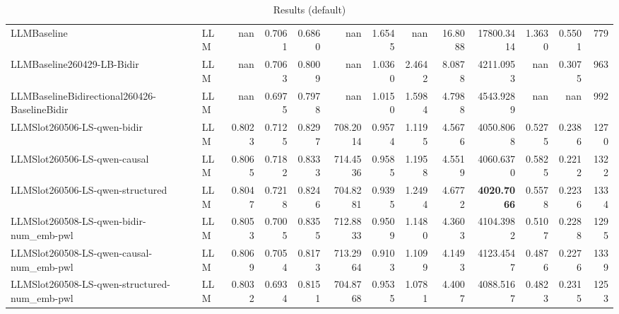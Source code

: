 \begin{table}[htbp]
{\begin{tabular}{ll|rrrrrrrrrr|r}
LLMBaseline & LLM & nan & 0.7061 & 0.6860 & nan & 1.6545 & nan & 16.8088 & 17800.3414 & 1.3630 & 0.5501 & 779 \\
LLMBaseline260429-LB-Bidir & LLM & nan & 0.7063 & 0.8009 & nan & 1.0360 & 2.4642 & 8.0878 & 4211.0953 & nan & 0.3075 & 963 \\
LLMBaselineBidirectional260426-BaselineBidir & LLM & nan & 0.6975 & 0.7978 & nan & 1.0150 & 1.5984 & 4.7988 & 4543.9289 & nan & nan & 992 \\
LLMSlot260506-LS-qwen-bidir & LLM & 0.8023 & 0.7125 & 0.8297 & 708.2014 & 0.9574 & 1.1195 & 4.5676 & 4050.8068 & 0.5275 & 0.2386 & 1270 \\
LLMSlot260506-LS-qwen-causal & LLM & 0.8065 & 0.7182 & 0.8333 & 714.4536 & 0.9585 & 1.1958 & 4.5519 & 4060.6370 & 0.5825 & 0.2212 & 1322 \\
LLMSlot260506-LS-qwen-structured & LLM & 0.8047 & 0.7218 & 0.8246 & 704.8281 & 0.9395 & 1.2494 & 4.6772 & \textbf{4020.7066} & 0.5578 & 0.2236 & 1334 \\
LLMSlot260508-LS-qwen-bidir-num\_emb-pwl & LLM & 0.8053 & 0.7005 & 0.8355 & 712.8833 & 0.9509 & 1.1480 & 4.3603 & 4104.3982 & 0.5107 & 0.2288 & 1295 \\
LLMSlot260508-LS-qwen-causal-num\_emb-pwl & LLM & 0.8069 & 0.7054 & 0.8173 & 713.2964 & 0.9103 & 1.1099 & 4.1493 & 4123.4547 & 0.4876 & 0.2276 & 1339 \\
LLMSlot260508-LS-qwen-structured-num\_emb-pwl & LLM & 0.8032 & 0.6934 & 0.8151 & 704.8768 & 0.9535 & 1.0781 & 4.4007 & 4088.5167 & 0.4823 & 0.2315 & 1253 \\
\bottomrule
\end{tabular}
}
\caption{Results (default)}
\label{tab:results_default}
\end{table}